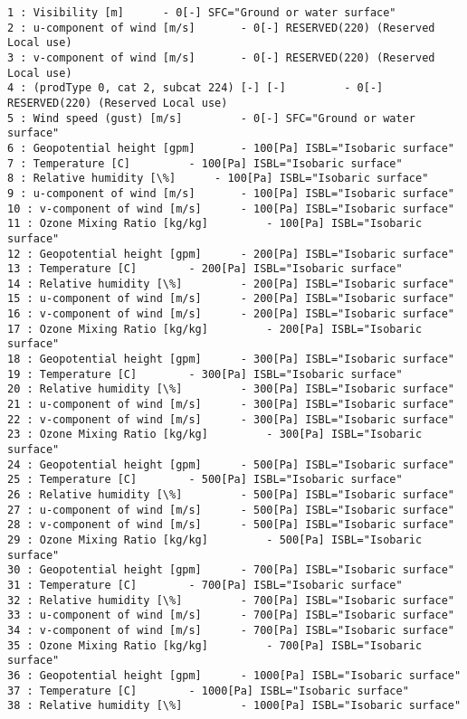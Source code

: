 \documentclass[11pt]{article}
\begin{document}
    \begin{Verbatim}[commandchars=\\\{\}]
1 : Visibility [m] 		- 0[-] SFC="Ground or water surface"
2 : u-component of wind [m/s] 		- 0[-] RESERVED(220) (Reserved Local use)
3 : v-component of wind [m/s] 		- 0[-] RESERVED(220) (Reserved Local use)
4 : (prodType 0, cat 2, subcat 224) [-] [-] 		- 0[-] RESERVED(220) (Reserved Local use)
5 : Wind speed (gust) [m/s] 		- 0[-] SFC="Ground or water surface"
6 : Geopotential height [gpm] 		- 100[Pa] ISBL="Isobaric surface"
7 : Temperature [C] 		- 100[Pa] ISBL="Isobaric surface"
8 : Relative humidity [\%] 		- 100[Pa] ISBL="Isobaric surface"
9 : u-component of wind [m/s] 		- 100[Pa] ISBL="Isobaric surface"
10 : v-component of wind [m/s] 		- 100[Pa] ISBL="Isobaric surface"
11 : Ozone Mixing Ratio [kg/kg] 		- 100[Pa] ISBL="Isobaric surface"
12 : Geopotential height [gpm] 		- 200[Pa] ISBL="Isobaric surface"
13 : Temperature [C] 		- 200[Pa] ISBL="Isobaric surface"
14 : Relative humidity [\%] 		- 200[Pa] ISBL="Isobaric surface"
15 : u-component of wind [m/s] 		- 200[Pa] ISBL="Isobaric surface"
16 : v-component of wind [m/s] 		- 200[Pa] ISBL="Isobaric surface"
17 : Ozone Mixing Ratio [kg/kg] 		- 200[Pa] ISBL="Isobaric surface"
18 : Geopotential height [gpm] 		- 300[Pa] ISBL="Isobaric surface"
19 : Temperature [C] 		- 300[Pa] ISBL="Isobaric surface"
20 : Relative humidity [\%] 		- 300[Pa] ISBL="Isobaric surface"
21 : u-component of wind [m/s] 		- 300[Pa] ISBL="Isobaric surface"
22 : v-component of wind [m/s] 		- 300[Pa] ISBL="Isobaric surface"
23 : Ozone Mixing Ratio [kg/kg] 		- 300[Pa] ISBL="Isobaric surface"
24 : Geopotential height [gpm] 		- 500[Pa] ISBL="Isobaric surface"
25 : Temperature [C] 		- 500[Pa] ISBL="Isobaric surface"
26 : Relative humidity [\%] 		- 500[Pa] ISBL="Isobaric surface"
27 : u-component of wind [m/s] 		- 500[Pa] ISBL="Isobaric surface"
28 : v-component of wind [m/s] 		- 500[Pa] ISBL="Isobaric surface"
29 : Ozone Mixing Ratio [kg/kg] 		- 500[Pa] ISBL="Isobaric surface"
30 : Geopotential height [gpm] 		- 700[Pa] ISBL="Isobaric surface"
31 : Temperature [C] 		- 700[Pa] ISBL="Isobaric surface"
32 : Relative humidity [\%] 		- 700[Pa] ISBL="Isobaric surface"
33 : u-component of wind [m/s] 		- 700[Pa] ISBL="Isobaric surface"
34 : v-component of wind [m/s] 		- 700[Pa] ISBL="Isobaric surface"
35 : Ozone Mixing Ratio [kg/kg] 		- 700[Pa] ISBL="Isobaric surface"
36 : Geopotential height [gpm] 		- 1000[Pa] ISBL="Isobaric surface"
37 : Temperature [C] 		- 1000[Pa] ISBL="Isobaric surface"
38 : Relative humidity [\%] 		- 1000[Pa] ISBL="Isobaric surface"

\end{Verbatim}
\end{document}
